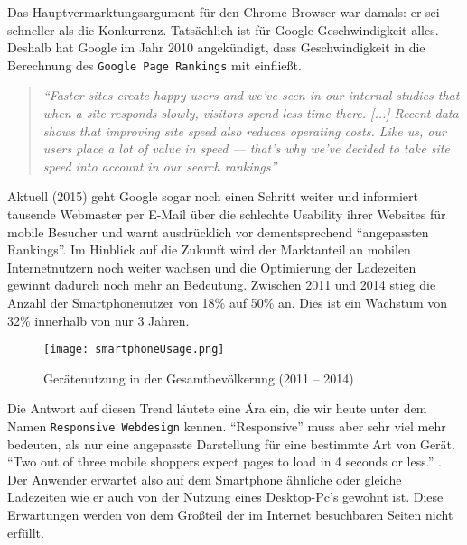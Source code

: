 		Das Hauptvermarktungsargument für den Chrome Browser war damals: er sei schneller als die Konkurrenz. Tatsächlich ist für Google Geschwindigkeit alles. Deshalb hat Google im Jahr 2010 angekündigt, dass Geschwindigkeit in die Berechnung des \texttt{Google Page Rankings} mit einfließt.

		\begin{quote}\itshape
			"`Faster sites create happy users and we've seen in our internal studies that when a site responds slowly, visitors spend less time there. [...] Recent data shows that improving site speed also reduces operating costs. Like us, our users place a lot of value in speed — that's why we've decided to take site speed into account in our search rankings"'\autocite{google10}
		\end{quote}

		Aktuell (2015) geht Google sogar noch einen Schritt weiter und informiert tausende Webmaster per E-Mail über die schlechte Usability ihrer Websites für mobile Besucher und warnt ausdrücklich vor dementsprechend "`angepassten Rankings"'.\autocite{t3n15}
		Im Hinblick auf die Zukunft wird der Marktanteil an mobilen Internetnutzern noch weiter wachsen und die Optimierung der Ladezeiten gewinnt dadurch noch mehr an Bedeutung. Zwischen 2011 und 2014 stieg die Anzahl der Smartphonenutzer von 18\% auf 50\% an. Dies ist ein Wachstum von 32\% innerhalb von nur 3 Jahren.\autocite{tns14}\\

		\begin{figure}[htbp]
			\begin{center}
				\texttt{[image: smartphoneUsage.png]}
			\end{center}
			\caption{Gerätenutzung in der Gesamtbevölkerung (2011 – 2014)\autocite{tns14}}
			\label{fig:geraetenutzung}
		\end{figure}

		Die Antwort auf diesen Trend läutete eine Ära ein, die wir heute unter dem Namen \texttt{Responsive Webdesign} kennen. "`Responsive"' muss aber sehr viel mehr bedeuten, als nur eine angepasste Darstellung für eine bestimmte Art von Gerät. "`Two out of three mobile shoppers expect pages to load in 4 seconds or less."' \autocite{radware13}. Der Anwender erwartet also auf dem Smartphone ähnliche oder gleiche Ladezeiten wie er auch von der Nutzung eines Desktop-Pc's gewohnt ist. Diese Erwartungen werden von dem Großteil der im Internet besuchbaren Seiten nicht erfüllt. 


